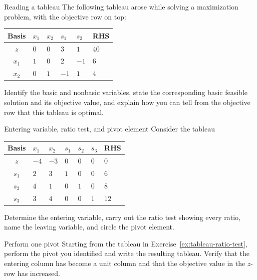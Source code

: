 \begin{ex}{Reading a tableau}{}
\label{ex:tableau-reading}
 The following tableau arose while solving a maximization problem, with the objective row on top:
\begin{center}
\renewcommand{\arraystretch}{1.3}
\begin{tabular}{c|ZZZZ|Z}
\toprule
Basis & $x_1$ & $x_2$ & $s_1$ & $s_2$ & RHS\\
\midrule
$z$   & $0$ & $0$ & $3$ & $1$ & $40$\\
\midrule
$x_1$ & $1$ & $0$ & $2$  & $-1$ & $6$\\
$x_2$ & $0$ & $1$ & $-1$ & $1$  & $4$\\
\bottomrule
\end{tabular}
\end{center}
Identify the basic and nonbasic variables, state the corresponding basic feasible solution and its objective value, and explain how you can tell from the objective row that this tableau is optimal.
\exrefs{\S\ref{sec:tableau-building}; \S\ref{sec:tableau-optimality}}
\end{ex}

\begin{ex}{Entering variable, ratio test, and pivot element}{}
\label{ex:tableau-ratio-test}
 Consider the tableau
\begin{center}
\renewcommand{\arraystretch}{1.3}
\begin{tabular}{c|ZZZZZ|Z}
\toprule
Basis & $x_1$ & $x_2$ & $s_1$ & $s_2$ & $s_3$ & RHS\\
\midrule
$z$   & $-4$ & $-3$ & $0$ & $0$ & $0$ & $0$\\
\midrule
$s_1$ & $2$ & $3$ & $1$ & $0$ & $0$ & $6$\\
$s_2$ & $4$ & $1$ & $0$ & $1$ & $0$ & $8$\\
$s_3$ & $3$ & $4$ & $0$ & $0$ & $1$ & $12$\\
\bottomrule
\end{tabular}
\end{center}
Determine the entering variable, carry out the ratio test showing every ratio, name the leaving variable, and circle the pivot element.
\exrefs{\S\ref{sec:tableau-pivot}}
\end{ex}


\begin{ex}{Perform one pivot}{}
\label{ex:tableau-one-pivot}
 Starting from the tableau in Exercise~\ref{ex:tableau-ratio-test}, perform the pivot you identified and write the resulting tableau. Verify that the entering column has become a unit column and that the objective value in the $z$-row has increased.
\exrefs{\S\ref{sec:tableau-pivot}}
\end{ex}

